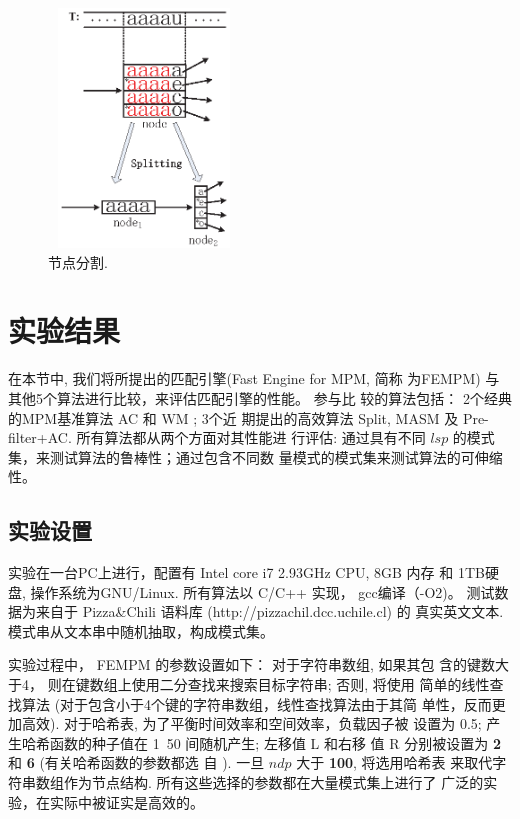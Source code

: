 \begin{figure}[!h]
  \centering
  \includegraphics[height=2.5in, width=2in]{figures/2_MPM/node_split}
  \caption{节点分割.}
  \label{fig:split}
\end{figure}



\section{实验结果}
\label{sec:experiments}

在本节中, 我们将所提出的匹配引擎(Fast Engine for MPM, 简称
为\textsf{FEMPM}) 与其他5个算法进行比较，来评估匹配引擎的性能。 参与比
较的算法包括： 2个经典的MPM基准算法 \textsf{AC} 和 \textsf{WM} ; 3个近
期提出的高效算法 \textsf{Split},
\textsf{MASM} 及 \textsf{Pre-filter+AC}. 所有算法都从两个方面对其性能进
行评估: 通过具有不同 $lsp$ 的模式集，来测试算法的鲁棒性；通过包含不同数
量模式的模式集来测试算法的可伸缩性。

\subsection{实验设置}


实验在一台PC上进行，配置有 Intel core i7 2.93GHz CPU, 8GB 内存 和 1TB硬
盘, 操作系统为GNU/Linux. 所有算法以 C/C++ 实现， gcc编译（-O2)。 测试数
据为来自于 Pizza\;\&\;Chili 语料库 (http://pizzachil.dcc.uchile.cl) 的
真实英文文本. 模式串从文本串中随机抽取，构成模式集。

实验过程中， \textsf{FEMPM} 的参数设置如下： 对于字符串数组, 如果其包
含的键数大于4， 则在键数组上使用二分查找来搜索目标字符串; 否则, 将使用
简单的线性查找算法 (对于包含小于4个键的字符串数组，线性查找算法由于其简
单性，反而更加高效). 对于哈希表, 为了平衡时间效率和空间效率，负载因子被
设置为 {0.5}; 产生哈希函数的种子值在 1~50 间随机产生; 左移值 L 和右移
值 R 分别被设置为 \textbf{2} 和 \textbf{6} (有关哈希函数的参数都选
自 \cite{Ramakrishna1997}). 一旦 $ndp$ 大于 \textbf{100}, 将选用哈希表
来取代字符串数组作为节点结构. 所有这些选择的参数都在大量模式集上进行了
广泛的实验，在实际中被证实是高效的。

